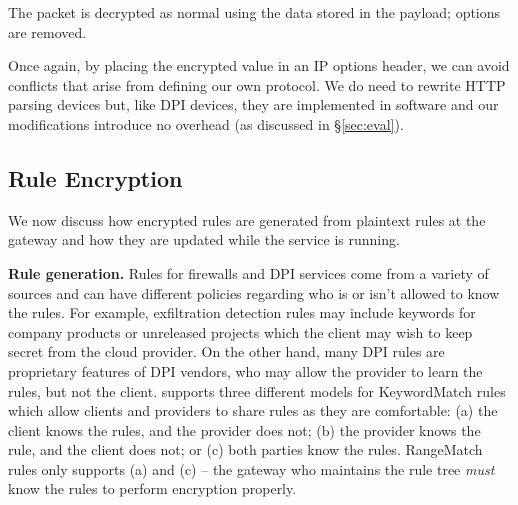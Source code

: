 The packet is decrypted as normal using the data stored in the payload; options are removed.

Once again, by placing the encrypted value in an IP options header, we can avoid conflicts that arise from defining our own protocol.
We do need to rewrite HTTP parsing devices but, like DPI devices, they are implemented in software and our modifications introduce no overhead (as discussed in \S\ref{sec:eval}).


\subsection{Rule Encryption}
\label{sec:rulenc}

We now discuss how encrypted rules are generated from plaintext rules at the gateway and how they are updated while the service is running.

\noindent\textbf{Rule generation.} Rules for firewalls and DPI services come from a variety of sources and can have different policies regarding who is or isn't allowed to know the rules. 
For example, exfiltration detection rules may include keywords for company products or unreleased projects which the client may wish to keep secret from the cloud provider. 
On the other hand, many DPI rules are proprietary features of DPI vendors, who may allow the provider to learn the rules, but not the client.
\sys supports three different models for KeywordMatch rules which allow clients and providers to share rules as they are comfortable: (a) the client knows the rules, and the provider does not; (b) the provider knows the rule, and the client does not; or (c) both parties know the rules.
RangeMatch rules only supports (a) and (c) -- the gateway who maintains the rule tree {\it must} know the rules to perform encryption properly.

